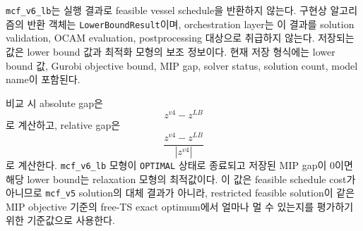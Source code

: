 \documentclass[11pt]{article}
\begin{document}
\texttt{mcf\_v6\_lb}는 실행 결과로 feasible vessel schedule을 반환하지 않는다.
구현상 알고리즘의 반환 객체는 \texttt{LowerBoundResult}이며, orchestration layer는
이 결과를 solution validation, OCAM evaluation, postprocessing 대상으로 취급하지
않는다. 저장되는 값은 lower bound 값과 최적화 모형의 보조 정보이다. 현재 저장
형식에는 lower bound 값, Gurobi objective bound, MIP gap, solver status, solution
count, model name이 포함된다.

비교 시 absolute gap은
\[
  z^{v4}-z^{LB}
\]
로 계산하고, relative gap은
\[
  \frac{z^{v4}-z^{LB}}{|z^{v4}|}
\]
로 계산한다. \texttt{mcf\_v6\_lb} 모형이 \texttt{OPTIMAL} 상태로 종료되고 저장된
MIP gap이 $0$이면 해당 lower bound는 relaxation 모형의 최적값이다.
이 값은 feasible schedule cost가 아니므로 \texttt{mcf\_v5} solution의 대체 결과가
아니라, restricted feasible solution이 같은 MIP objective 기준의 free-TS
exact optimum에서 얼마나 멀 수 있는지를 평가하기 위한 기준값으로 사용한다.
\end{document}

